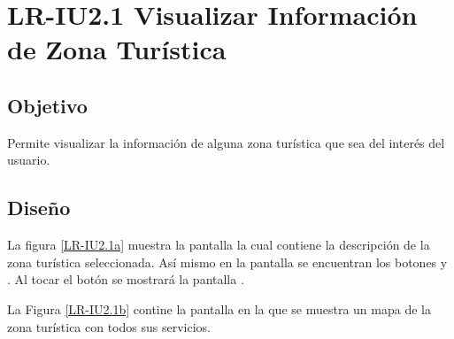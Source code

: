 \newpage
\section{LR-IU2.1 Visualizar Información de Zona Turística}

\subsection{Objetivo}
Permite visualizar la información de alguna zona turística que sea del interés del usuario.

\subsection{Diseño}
La figura \ref{LR-IU2.1a} muestra la pantalla  la cual contiene la descripción de la zona turística seleccionada. Así mismo en la pantalla se encuentran los botones  y . Al tocar el botón  se mostrará la pantalla .



La Figura \ref{LR-IU2.1b} contine la pantalla  en la que se muestra un mapa de la zona turística con todos sus servicios.

